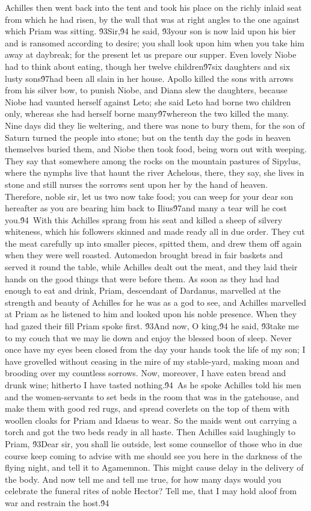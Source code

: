 {Achilles then went back into the tent and took his place on the richly inlaid seat from which he had risen, by the wall that was at right angles to the one against which Priam was sitting. \'93Sir,\'94 he said, \'93your son is now laid upon his bier and is ransomed according to desire; you shall look upon him when you take him away at daybreak; for the present let us prepare our supper. Even lovely Niobe had to think about eating, though her twelve children\'97six daughters and six lusty sons\'97had been all slain in her house. Apollo killed the sons with arrows from his silver bow, to punish Niobe, and Diana slew the daughters, because Niobe had vaunted herself against Leto; she said Leto had borne two children only, whereas she had herself borne many\'97whereon the two killed the many. Nine days did they lie weltering, and there was none to bury them, for the son of Saturn turned the people into stone; but on the tenth day the gods in heaven themselves buried them, and Niobe then took food, being worn out with weeping. They say that somewhere among the rocks on the mountain pastures of Sipylus, where the nymphs live that haunt the river Achelous, there, they say, she lives in stone and still nurses the sorrows sent upon her by the hand of heaven. Therefore, noble sir, let us two now take food; you can weep for your dear son hereafter as you are bearing him back to Ilius\'97and many a tear will he cost you.\'94\
With this Achilles sprang from his seat and killed a sheep of silvery whiteness, which his followers skinned and made ready all in due order. They cut the meat carefully up into smaller pieces, spitted them, and drew them off again when they were well roasted. Automedon brought bread in fair baskets and served it round the table, while Achilles dealt out the meat, and they laid their hands on the good things that were before them. As soon as they had had enough to eat and drink, Priam, descendant of Dardanus, marvelled at the strength and beauty of Achilles for he was as a god to see, and Achilles marvelled at Priam as he listened to him and looked upon his noble presence. When they had gazed their fill Priam spoke first. \'93And now, O king,\'94 he said, \'93take me to my couch that we may lie down and enjoy the blessed boon of sleep. Never once have my eyes been closed from the day your hands took the life of my son; I have grovelled without ceasing in the mire of my stable-yard, making moan and brooding over my countless sorrows. Now, moreover, I have eaten bread and drunk wine; hitherto I have tasted nothing.\'94\
As he spoke Achilles told his men and the women-servants to set beds in the room that was in the gatehouse, and make them with good red rugs, and spread coverlets on the top of them with woollen cloaks for Priam and Idaeus to wear. So the maids went out carrying a torch and got the two beds ready in all haste. Then Achilles said laughingly to Priam, \'93Dear sir, you shall lie outside, lest some counsellor of those who in due course keep coming to advise with me should see you here in the darkness of the flying night, and tell it to Agamemnon. This might cause delay in the delivery of the body. And now tell me and tell me true, for how many days would you celebrate the funeral rites of noble Hector? Tell me, that I may hold aloof from war and restrain the host.\'94\
}
